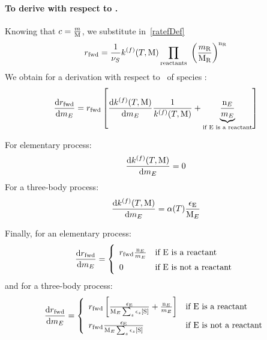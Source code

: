 \paragraph{To derive with respect to \mass.}
Knowing that $\conc = \frac{\mass}{\Mm}$, we substitute in~\ref{ratefDef}
\begin{equation}
\ratef = \frac{1}{\scoef[S]} \rateConsf \prod_\text{reactants}  \left(\frac{\mass[\reac]}{\Mm[\reac]}\right)^{\scoefabs[\reac]}
\end{equation}
We obtain for a derivation with respect to \mass[E]\ of species :
\begin{equation}
\doverdm[E]{\ratef} = \ratef \left[
                                \doverdm[E]{\rateConsf} \frac{1}{\rateConsf} +
                                \underbrace{\frac{\scoefabs[E]}{\mass[E]}}_{\text{if \ce{E} is a reactant}}
                              \right]
\end{equation}

For elementary process:
\begin{equation}
\doverdm[E]{\rateConsf} = 0
\end{equation}
For a three-body process:
\begin{equation}
\doverdm[E]{\rateConsf} = \kinMod \frac{\epsilon_{\ce{E}}}{\Mm[E]}
\end{equation}

Finally, for an elementary process:
\begin{equation}
\doverdm[E]{\ratef} = \left\{\begin{array}{ll}
                        \ratef \frac{\scoefabs[E]}{\mass[E]} & \text{if \ce{E} is a reactant} \\
                        0                                    & \text{if \ce{E} is not a reactant} \\
                      \end{array}\right.
\end{equation}
and for a three-body process:
\begin{equation}
\renewcommand{\arraystretch}{1.5}
\doverdm[E]{\ratef} = \left\{\begin{array}{ll}
                        \ratef \left[\frac{\epsilon_{\ce{E}}}{\Mm[E]\threeBody} + \frac{\scoefabs[E]}{\mass[E]} \right] 
                                                & \text{if \ce{E} is a reactant} \\
                        \ratef \frac{\epsilon_{\ce{E}}}{\Mm[E]\threeBody} 
                                                & \text{if \ce{E} is not a reactant} \\
                      \end{array}\right.
\end{equation}

